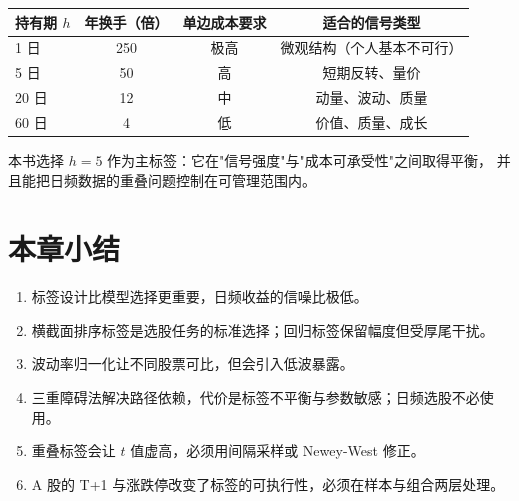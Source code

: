 \begin{center}
\begin{tabular}{@{}lccc@{}}
\toprule
持有期 $h$ & 年换手（倍） & 单边成本要求 & 适合的信号类型 \\
\midrule
1 日 & 250 & 极高 & 微观结构（个人基本不可行） \\
5 日 & 50 & 高 & 短期反转、量价 \\
20 日 & 12 & 中 & 动量、波动、质量 \\
60 日 & 4 & 低 & 价值、质量、成长 \\
\bottomrule
\end{tabular}
\end{center}

本书选择 $h=5$ 作为主标签：它在"信号强度"与"成本可承受性"之间取得平衡，
并且能把日频数据的重叠问题控制在可管理范围内。

\section{本章小结}

\begin{enumerate}
  \item 标签设计比模型选择更重要，日频收益的信噪比极低。
  \item 横截面排序标签是选股任务的标准选择；回归标签保留幅度但受厚尾干扰。
  \item 波动率归一化让不同股票可比，但会引入低波暴露。
  \item 三重障碍法解决路径依赖，代价是标签不平衡与参数敏感；日频选股不必使用。
  \item 重叠标签会让 $t$ 值虚高，必须用间隔采样或 Newey-West 修正。
  \item A 股的 T+1 与涨跌停改变了标签的可执行性，必须在样本与组合两层处理。
\end{enumerate}
